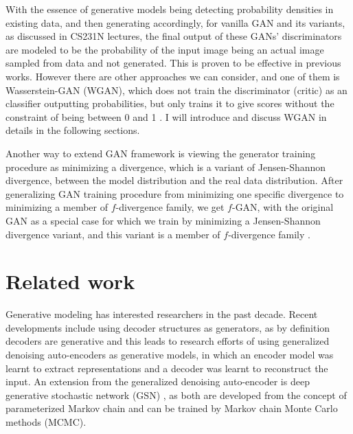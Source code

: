 \documentclass[10pt,twocolumn,letterpaper]{article}
\begin{document}
With the essence of generative models being detecting probability densities in existing data, and then generating accordingly, for vanilla GAN and its variants, as discussed in CS231N lectures, the final output of these GANs' discriminators are modeled to be the probability of the input image being an actual image sampled from data and not generated. This is proven to be effective in previous works. However there are other approaches we can consider, and one of them is Wasserstein-GAN (WGAN), which does not train the discriminator (critic) as an classifier outputting probabilities, but only trains it to give scores without the constraint of being between 0 and 1 \cite{arjovsky2017wasserstein}. I will introduce and discuss WGAN in details in the following sections. 

Another way to extend GAN framework is viewing the generator training procedure as minimizing a divergence, which is a variant of Jensen-Shannon divergence, between the model distribution and the real data distribution. After generalizing GAN training procedure from minimizing one specific divergence to minimizing a member of $f$-divergence family, we get $f$-GAN, with the original GAN as a special case for which we train by minimizing a Jensen-Shannon divergence variant, and this variant is a member of $f$-divergence family \cite{nowozin2016fgan}.




\section{Related work}
\label{related_work}

Generative modeling has interested researchers in the past decade. Recent developments include using decoder structures as generators, as by definition decoders are generative and this leads to research efforts of using generalized denoising auto-encoders \cite{bengio2013generalized} as generative models, in which an encoder model was learnt to extract representations and a decoder was learnt to reconstruct the input. An extension from the generalized denoising auto-encoder is deep generative stochastic network (GSN) \cite{bengio2014deep}, as both are developed from the concept of parameterized Markov chain and can be trained by Markov chain Monte Carlo methods (MCMC).
\end{document}

